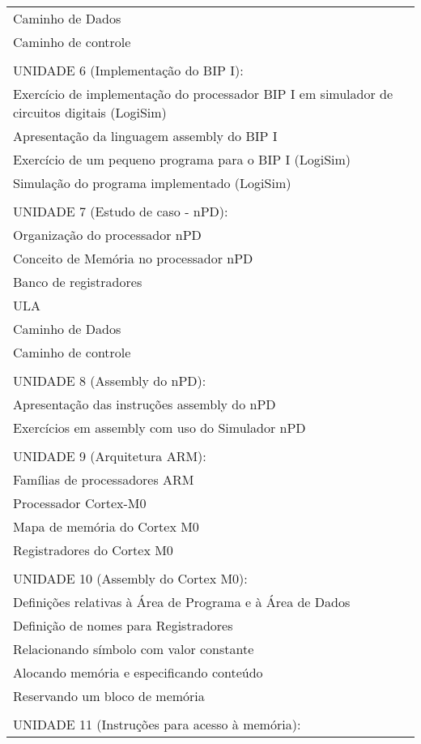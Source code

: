 \documentclass[12pt]{article}
\begin{document}
\begin{longtable}{|L{1.025\textwidth}|}
      Caminho de Dados \\
      Caminho de controle \\
\\
UNIDADE 6 (Implementação do BIP I):\\
      Exercício de implementação do processador BIP I em simulador de circuitos digitais (LogiSim)\\
      Apresentação da linguagem assembly do BIP I\\
      Exercício de um pequeno programa para o BIP I (LogiSim)\\
      Simulação do programa implementado (LogiSim)\\
\\
UNIDADE 7 (Estudo de caso - nPD):\\
      Organização do processador nPD\\
      Conceito de Memória no processador nPD\\
      Banco de registradores\\
      ULA\\
      Caminho de Dados\\ 
      Caminho de controle\\ 
\\
UNIDADE 8 (Assembly do nPD):\\
      Apresentação das instruções assembly do nPD\\
      Exercícios em assembly com uso do Simulador nPD\\
\\
UNIDADE 9 (Arquitetura ARM):\\
      Famílias de processadores ARM\\
      Processador Cortex-M0 \\
      Mapa de memória do Cortex M0\\
      Registradores do Cortex M0\\
\\
UNIDADE 10 (Assembly do Cortex M0):\\
      Definições relativas à Área de Programa e à Área de Dados\\
      Definição de nomes para Registradores \\
      Relacionando símbolo com valor constante\\
      Alocando memória e especificando conteúdo\\
      Reservando um bloco de memória\\
\\
UNIDADE 11 (Instruções para acesso à memória):\\

\end{longtable}
\end{document}
